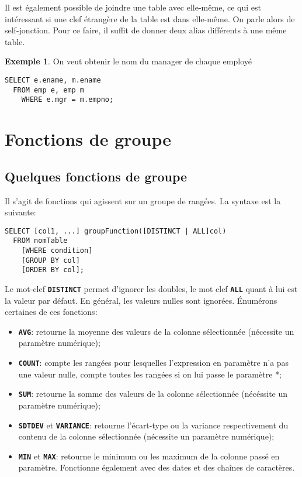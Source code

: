 \documentclass[a4paper, 12pt]{report}
\newcommand{\textSQL}[1]{\texttt{\textbf{#1}}}
\theoremstyle{definition} \newtheorem{ex}{Exemple}
\begin{document}
Il est également possible de joindre une table avec elle-même, ce qui est intéressant si une clef étrangère de la table est dans elle-même. On parle alors de self-jonction. Pour ce faire, il suffit de donner deux alias différents à une même table.
\begin{ex}
On veut obtenir le nom du manager de chaque employé
\begin{lstlisting}[frame=single]
SELECT e.ename, m.ename
  FROM emp e, emp m
	WHERE e.mgr = m.empno;
\end{lstlisting}
\end{ex}

\chapter{Fonctions de groupe}

\section{Quelques fonctions de groupe}
Il s'agit de fonctions qui agissent sur un groupe de rangées. La syntaxe est la suivante:
\begin{lstlisting}[frame=single]
SELECT [col1, ...] groupFunction([DISTINCT | ALL]col)
  FROM nomTable
	[WHERE condition]
	[GROUP BY col]
	[ORDER BY col];
\end{lstlisting}

Le mot-clef \textSQL{DISTINCT} permet d'ignorer les doubles, le mot clef \textSQL{ALL} quant à lui est la valeur par défaut. En général, les valeurs nulles sont ignorées. \'Enumérons certaines de ces fonctions: 
\begin{itemize}
\item \textSQL{AVG}: retourne la moyenne des valeurs de la colonne sélectionnée (nécessite un paramètre numérique);
\item \textSQL{COUNT}: compte les rangées pour lesquelles l'expression en paramètre n'a pas une valeur nulle, compte toutes les rangées si on lui passe le paramètre *;
\item \textSQL{SUM}: retourne la somme des valeurs de la colonne sélectionnée (nécéssite un paramètre numérique);
\item \textSQL{SDTDEV} et \textSQL{VARIANCE}: retourne l'écart-type ou la variance respectivement du contenu de la colonne sélectionnée (nécessite un paramètre numérique);
\item \textSQL{MIN} et \textSQL{MAX}: retourne le minimum ou les maximum de la colonne passé en paramètre. Fonctionne également avec des dates et des chaînes de caractères.
\end{itemize}
\end{document}
